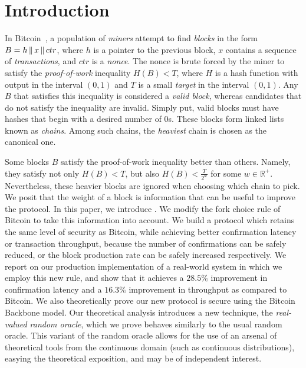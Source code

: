 \section{Introduction}

In Bitcoin~\cite{bitcoin}, a population of \emph{miners}
attempt to find \emph{blocks} in the form $B = h \,\|\, x \,\|\, ctr$,
where $h$ is a pointer to the previous block, $x$ contains a sequence of
\emph{transactions}, and $ctr$ is a \emph{nonce}. The nonce is brute forced
by the miner to satisfy the \emph{proof-of-work} inequality $H(B) < T$, where
$H$ is a hash function with output in the interval $(0, 1)$
and $T$ is a small \emph{target} in the interval $(0, 1)$. Any $B$ that satisfies this
inequality is considered a \emph{valid block}, whereas candidates that do not satisfy
the inequality are invalid. Simply put, valid blocks must have
hashes that begin with a desired number of $0$s.
These blocks form linked lists known as \emph{chains}.
Among such chains, the \emph{heaviest} chain is chosen as the canonical one.

Some blocks $B$ satisfy the proof-of-work inequality better than others.
Namely, they satisfy not only $H(B) < T$, but also $H(B) < \frac{T}{2^w}$
for some $w \in \mathbb{R}^+$. Nevertheless, these heavier blocks are ignored when choosing
which chain to pick.
We posit that the weight of a block is information
that can be useful to improve the protocol.
In this paper, we introduce \emph{\poem}.
We modify the fork choice rule of Bitcoin to take this information into account.
We build a protocol which retains the same level of security as Bitcoin, while achieving
better confirmation latency or transaction throughput, because the number of confirmations
can be safely reduced, or the block production rate can be safely increased respectively.
We report on our production implementation of a real-world system
in which we employ this new rule, and show that it achieves a $28.5\%$
improvement in confirmation latency
and a $16.3\%$ improvement in throughput as compared to Bitcoin.
We also theoretically prove our new protocol is secure
using the Bitcoin Backbone model. Our theoretical analysis introduces
a new technique, the \emph{real-valued random oracle}, which we prove behaves
similarly to the usual random oracle. This variant of the
random oracle allows for the use of an arsenal of theoretical tools from the
continuous domain (such as continuous distributions), easying the theoretical
exposition, and may be of independent interest.

